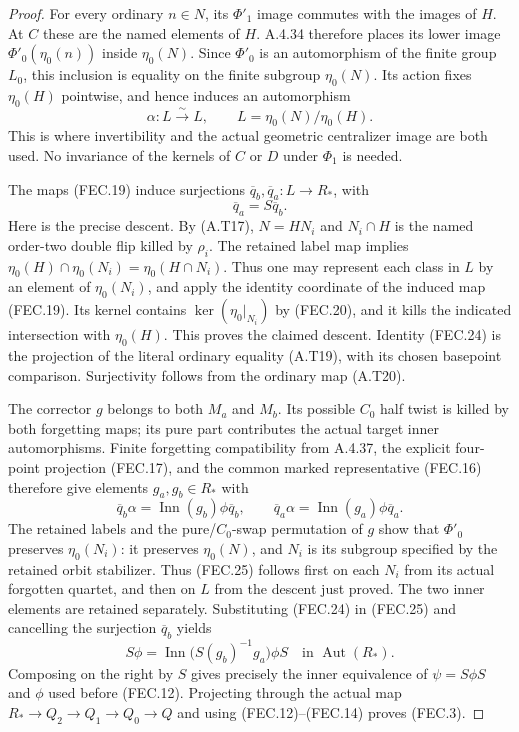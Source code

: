 \begin{proof}
For every ordinary $n\in N$, its $\Phi'_1$ image
commutes with the images of $H$.  At $C$ these are
the named elements of $H$.  A.4.34 therefore places
its lower image $\Phi'_0(\eta_0(n))$ inside $\eta_0(N)$.
Since $\Phi'_0$ is an automorphism of the finite
group $L_0$, this inclusion is equality on the
finite subgroup $\eta_0(N)$.  Its action fixes $\eta_0(H)$
pointwise, and hence induces an automorphism
\[
       \alpha:L\xrightarrow{\sim}L,
       \qquad L=\eta_0(N)/\eta_0(H).
                                                               \tag{FEC.23}
\]
This is where invertibility and the actual geometric
centralizer image are both used.  No invariance of
the kernels of $C$ or $D$ under $\Phi_1$ is needed.

The maps (FEC.19) induce surjections
$\overline q_b,\overline q_a:L\to R_*$, with
\[
                       \overline q_a=S\overline q_b.
                                                               \tag{FEC.24}
\]
Here is the precise descent.  By (A.T17),
$N=HN_i$ and $N_i\cap H$ is the named order-two
double flip killed by $\rho_i$.
The retained label map implies
$\eta_0(H)\cap \eta_0(N_i)=\eta_0(H\cap N_i)$.
Thus one may represent each class in $L$ by an
element of $\eta_0(N_i)$, and apply the identity
coordinate of the induced map (FEC.19).  Its kernel
contains $\ker(\eta_0|_{N_i})$ by (FEC.20), and it
kills the indicated intersection with $\eta_0(H)$.
This proves the claimed descent.
Identity (FEC.24) is the projection of the literal
ordinary equality (A.T19), with its chosen
basepoint comparison.  Surjectivity follows from
the ordinary map (A.T20).

The corrector $g$ belongs to both $M_a$ and $M_b$.
Its possible $C_0$ half twist is killed by both
forgetting maps; its pure part contributes the
actual target inner automorphisms.
Finite forgetting compatibility from A.4.37,
the explicit four-point projection (FEC.17), and
the common marked representative (FEC.16) therefore
give elements $g_a,g_b\in R_*$ with
\[
 \overline q_b\alpha
       =\operatorname{Inn}(g_b)\phi\overline q_b,
 \qquad
 \overline q_a\alpha
       =\operatorname{Inn}(g_a)\phi\overline q_a.
                                                               \tag{FEC.25}
\]
The retained labels and the pure/$C_0$-swap
permutation of $g$ show that $\Phi'_0$ preserves
$\eta_0(N_i)$: it preserves $\eta_0(N)$, and $N_i$
is its subgroup specified by the retained orbit
stabilizer.  Thus (FEC.25) follows first on each
$N_i$ from its actual forgotten quartet, and then
on $L$ from the descent just proved.  The two inner elements are retained
separately.  Substituting (FEC.24) in (FEC.25) and
cancelling the surjection $\overline q_b$ yields
\[
       S\phi=\operatorname{Inn}
          \bigl(S(g_b)^{-1}g_a\bigr)\phi S
                      \quad\text{in }\operatorname{Aut}(R_*).
                                                               \tag{FEC.26}
\]
Composing on the right by $S$ gives precisely the
inner equivalence of $\psi=S\phi S$ and $\phi$
used before (FEC.12).  Projecting through the actual
map $R_*\to Q_2\to Q_1\to Q_0\to Q$ and using
(FEC.12)--(FEC.14) proves (FEC.3).


\end{proof}
